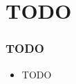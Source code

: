 \section{TODO}
    \begin{frame}[t]
        \frametitle{TODO}
        
        \vspace{-0.5em}
        \begin{itemize}
            \item TODO
        \end{itemize}

        \onslide %
    \end{frame}
